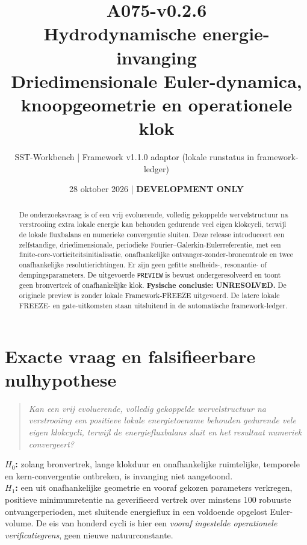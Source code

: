 \documentclass[10pt,a4paper]{article}
\title{\textcolor{main}{A075-v0.2.6}\\Hydrodynamische energie-invanging\\\large Driedimensionale Euler-dynamica, knoopgeometrie en operationele klok}
\author{SST-Workbench | Framework v1.1.0 adaptor (lokale runstatus in framework-ledger)}
\date{28 oktober 2026 | \textbf{DEVELOPMENT ONLY}}
\begin{document}
\maketitle
\begin{abstract}
De onderzoeksvraag is of een vrij evoluerende, volledig gekoppelde wervelstructuur na verstrooiing extra lokale energie kan behouden gedurende veel eigen klokcycli, terwijl de lokale fluxbalans en numerieke convergentie sluiten. Deze release introduceert een zelfstandige, driedimensionale, periodieke Fourier--Galerkin-Eulerreferentie, met een finite-core-vorticiteitsinitialisatie, onafhankelijke ontvanger-zonder-broncontrole en twee onafhankelijke resolutierichtingen. Er zijn geen gefitte snelheids-, resonantie- of dempingsparameters. De uitgevoerde \texttt{PREVIEW} is bewust ondergeresolveerd en toont geen bronvertrek of onafhankelijke klok. \textbf{Fysische conclusie: UNRESOLVED.} De originele preview is zonder lokale Framework-FREEZE uitgevoerd. De latere lokale FREEZE- en gate-uitkomsten staan uitsluitend in de automatische framework-ledger.
\end{abstract}
\section{Exacte vraag en falsifieerbare nulhypothese}
\begin{quote}\emph{Kan een vrij evoluerende, volledig gekoppelde wervelstructuur na verstrooiing een positieve lokale energietoename behouden gedurende vele eigen klokcycli, terwijl de energiefluxbalans sluit en het resultaat numeriek convergeert?}\end{quote}
\textbf{$H_0$:} zolang bronvertrek, lange klokduur en onafhankelijke ruimtelijke, temporele en kern-convergentie ontbreken, is invanging niet aangetoond.\\
\textbf{$H_1$:} een uit onafhankelijke geometrie en vooraf gekozen parameters verkregen, positieve minimumretentie na geverifieerd vertrek over minstens 100 robuuste ontvangerperioden, met sluitende energieflux in een voldoende opgelost Euler-volume.
De eis van honderd cycli is hier een \emph{vooraf ingestelde operationele verificatiegrens}, geen nieuwe natuurconstante.
\end{document}
